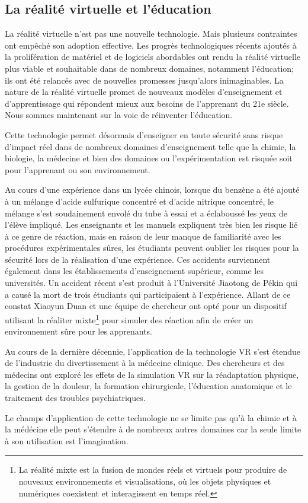\subsection{La réalité virtuelle et l'éducation}

La réalité virtuelle n'est pas une nouvelle technologie. Mais plusieurs contraintes ont empêché son adoption effective. Les progrès technologiques récents ajoutés à la prolifération de matériel et de logiciels abordables ont rendu la réalité virtuelle plus viable et souhaitable dans de nombreux domaines, notamment l'éducation; ils ont été relancés avec de nouvelles promesses jusqu'alors inimaginables. La nature de la réalité virtuelle promet de nouveaux modèles d'enseignement et d'apprentissage qui répondent mieux aux besoins de l'apprenant du 21e siècle. 
Nous sommes maintenant sur la voie de réinventer l'éducation.

Cette technologie permet désormais d'enseigner en toute sécurité sans risque d'impact réel dans de nombreux domaines d'enseignement telle que la chimie, la biologie, la médecine et bien des domaines ou l'expérimentation est risquée soit pour l'apprenant ou son environnement.

Au cours d'une expérience dans un lycée chinois, lorsque du benzène a été ajouté à un mélange d'acide sulfurique concentré et d'acide nitrique concentré, le mélange s'est soudainement envolé du tube à essai et a éclaboussé les yeux de l'élève impliqué\cite{duan2020mixed}. 
Les enseignants et les manuels expliquent très bien les risque lié à ce genre de réaction, mais en raison de leur manque de familiarité avec les procédures expérimentales sûres, les étudiants peuvent oublier les risques pour la sécurité lors de la réalisation d'une expérience\cite{duan2020mixed}.
Ces accidents surviennent également dans les établissements d'enseignement supérieur, comme les universités. Un accident récent s'est produit à l'Université Jiaotong de Pékin qui a causé la mort de trois étudiants qui participaient à l'expérience.
Allant de ce constat Xiaoyun Duan\cite{duan2020mixed} et une équipe de chercheur ont opté pour un dispositif utilisant la réaliter mixte\footnote{La réalité mixte est la fusion de mondes réels et virtuels pour produire de nouveaux environnements et visualisations, où les objets physiques et numériques coexistent et interagissent en temps réel.} pour simuler des réaction afin de créer un environnement sûre pour les apprenants. 

Au cours de la dernière décennie, l'application de la technologie VR s'est étendue de l'industrie du divertissement à la médecine clinique. Des chercheurs et des médecins ont exploré les effets de la simulation VR sur la réadaptation physique, la gestion de la douleur, la formation chirurgicale, l'éducation anatomique et le traitement des troubles psychiatriques\cite{li2011virtual, baldominos2015approach, malloy2010effectiveness, alaker2016virtual, yiannakopoulou2015virtual, hackett2016three}.

Le champs d'application de cette technologie ne se limite pas qu'à la chimie et à la médécine elle peut s'étendre à de nombreux autres domaines car la seule limite à son utilisation est l'imagination.